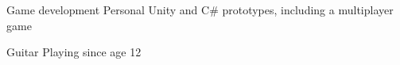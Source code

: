 


\begin{cvskills}


\cvskill
{Game development}
{Personal Unity and C\# prototypes, including a multiplayer game}


\cvskill
{Guitar}
{Playing since age 12}


\end{cvskills}
